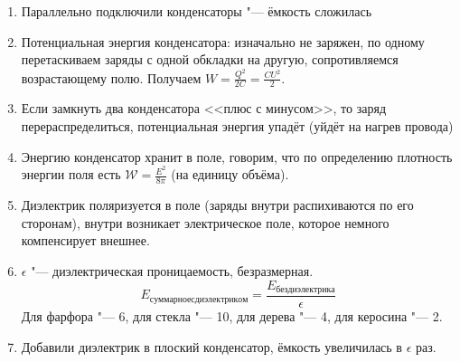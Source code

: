 \documentclass[10pt,a4paper]{article}
\begin{document}
\begin{enumerate}
\item Параллельно подключили конденсаторы "--- ёмкость сложилась
\item
	Потенциальная энергия конденсатора: изначально не заряжен, по одному перетаскиваем заряды с одной обкладки на другую, сопротивляемся возрастающему полю.
	Получаем $W=\frac{Q^2}{2C}=\frac{CU^2}{2}$.
\item
	Если замкнуть два конденсатора <<плюс с минусом>>, то заряд перераспределиться, потенциальная энергия упадёт (уйдёт на нагрев провода)
\item
	Энергию конденсатор хранит в поле, говорим, что по определению плотность энергии поля есть $\mathcal{W}=\frac{E^2}{8\pi}$ (на единицу объёма).
\item
	Диэлектрик поляризуется в поле (заряды внутри распихиваются по его сторонам), внутри возникает электрическое поле, которое немного компенсирует внешнее.
\item
	$\epsilon$ "--- диэлектрическая проницаемость, безразмерная.
	\[ E_{суммарное с диэлектриком} = \frac{E_{без диэлектрика}}{\epsilon} \]
	Для фарфора "--- 6, для стекла "--- 10, для дерева "--- 4, для керосина "--- 2.
\item
	Добавили диэлектрик в плоский конденсатор, ёмкость увеличилась в $\epsilon$ раз.
\end{enumerate}
\end{document}
